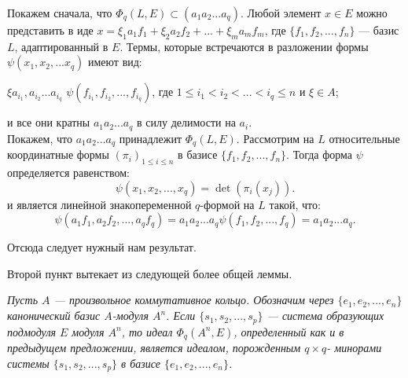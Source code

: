 \begin{myproof}
Покажем сначала, что $\Phi _q (L, E) \subset (a_1 a_2 ... a_q)$. Любой элемент $ x \in E$ можно представить в иде $x = \xi _1 a_1 f_1 + \xi _2 a_2 f_2 + ... + \xi _m a_m f_m$, где $\{f_1, f_2, ..., f_n\}$ — базис $L$, адаптированный в $E$. Термы, которые встречаются в разложении формы $\psi (x_1, x_2, ... x_q)$ имеют вид:
\begin{center}
$\xi a_{i_1}, a_{i_2} ... a_{i_q}$ $ \psi (f_{i_1}, f_{i_2}, ...,f_{i_q})$,
где $1 \leqslant i_1 < i_2 < ... < i_q \leqslant n$ и $\xi \in A$;
\end{center}
и все они кратны $a_1 a_2 ... a_q$ в силу делимости на $a_i$.\\
\noindent Покажем, что $a_1 a_2 ... a_q$ принадлежит $\Phi _q (L, E).$ Рассмотрим на $L$ относительные координатные формы $(\pi _i)_{1 \leqslant i \leqslant n}$ в базисе $\{f_1, f_2, ..., f_n \}$. Тогда форма $\psi$ определяется равенством:
$$ \psi (x_1, x_2, ..., x_q) = \det(\pi _i (x_j)).$$
\noindent  и является линейной знакопеременной $q$-формой на $L$ такой, что:
$$\psi (a_1 f_1, a_2 f_2, ..., a_q f_q) = a_1 a_2 ... a_q \psi (f_1, f_2, ..., f_q) = a_1 a_2 ... a_q.$$

\noindent Отсюда следует нужный нам результат.

\noindent Второй пункт вытекает из следующей более общей леммы.
\end{myproof}
\begin{lemma}
\hspace*{0.5cm}

\textit{Пусть $A$ — произвольное коммутативное кольцо. Обозначим через $\{e_1, e_2, ..., e_n\}$ канонический базис $A$-модуля $A^{n}$. Если $\{s_1, s_2, ..., s_p\}$ — система образующих подмодуля $E$ модуля $A^{n}$, то идеал $\Phi _q (A^{n}, E)$, определенный как и в предыдущем предложении, является идеалом, порожденным $q \times q$- минорами системы  $\{s_1, s_2, ..., s_p\}$ в базисе $\{e_1, e_2, ..., e_n\}$.}
\end{lemma}
